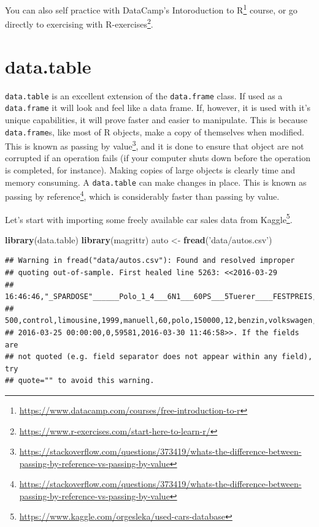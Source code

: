 \documentclass[]{book}
\newenvironment{Shaded}{\begin{snugshade}}{\end{snugshade}}
\newcommand{\KeywordTok}[1]{\textcolor[rgb]{0.13,0.29,0.53}{\textbf{#1}}}
\newcommand{\NormalTok}[1]{#1}
\newcommand{\StringTok}[1]{\textcolor[rgb]{0.31,0.60,0.02}{#1}}
\renewcommand{\href}[2]{#2\footnote{\url{#1}}}
\theoremstyle{definition}
\theoremstyle{definition}
\theoremstyle{definition}
\theoremstyle{remark}
\begin{document}
You can also self practice with DataCamp's \href{https://www.datacamp.com/courses/free-introduction-to-r}{Intoroduction to R} course, or go directly to exercising with \href{https://www.r-exercises.com/start-here-to-learn-r/}{R-exercises}.

\hypertarget{datatable}{%
\chapter{data.table}\label{datatable}}

\texttt{data.table} is an excellent extension of the \texttt{data.frame} class.
If used as a \texttt{data.frame} it will look and feel like a data frame.
If, however, it is used with it's unique capabilities, it will prove faster and easier to manipulate.
This is because \texttt{data.frame}s, like most of R objects, make a copy of themselves when modified.
This is known as \href{https://stackoverflow.com/questions/373419/whats-the-difference-between-passing-by-reference-vs-passing-by-value}{passing by value}, and it is done to ensure that object are not corrupted if an operation fails (if your computer shuts down before the operation is completed, for instance).
Making copies of large objects is clearly time and memory consuming.
A \texttt{data.table} can make changes in place.
This is known as \href{https://stackoverflow.com/questions/373419/whats-the-difference-between-passing-by-reference-vs-passing-by-value}{passing by reference}, which is considerably faster than passing by value.

Let's start with importing some freely available car sales data from \href{https://www.kaggle.com/orgesleka/used-cars-database}{Kaggle}.

\begin{Shaded}
\begin{Highlighting}[]
\KeywordTok{library}\NormalTok{(data.table)}
\KeywordTok{library}\NormalTok{(magrittr)}
\NormalTok{auto <-}\StringTok{ }\KeywordTok{fread}\NormalTok{(}\StringTok{'data/autos.csv'}\NormalTok{)}
\end{Highlighting}
\end{Shaded}

\begin{verbatim}
## Warning in fread("data/autos.csv"): Found and resolved improper
## quoting out-of-sample. First healed line 5263: <<2016-03-29
## 16:46:46,"_SPARDOSE"______Polo_1_4___6N1___60PS___5Tuerer____FESTPREIS,privat,Angebot,
## 500,control,limousine,1999,manuell,60,polo,150000,12,benzin,volkswagen,ja,
## 2016-03-25 00:00:00,0,59581,2016-03-30 11:46:58>>. If the fields are
## not quoted (e.g. field separator does not appear within any field), try
## quote="" to avoid this warning.
\end{verbatim}
\end{document}
